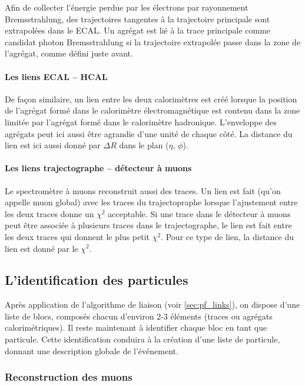 Afin de collecter l'énergie perdue par les électrons par rayonnement Bremsstrahlung, des trajectoires tangentes à la trajectoire principale sont extrapolées dans le ECAL. Un agrégat est lié à la trace principale comme candidat photon Bremsstrahlung si la trajectoire extrapolée passe dans la zone de l'agrégat, comme défini juste avant.

\paragraph{Les liens ECAL – HCAL}

De façon similaire, un lien entre les deux calorimètres est créé lorsque la position de l'agrégat formé dans le calorimètre électromagnétique est contenu dans la zone limitée par l'agrégat formé dans le calorimètre hadronique. L'enveloppe des agrégats peut ici aussi être agrandie d'une unité de chaque côté. La distance du lien est ici aussi donné par $\Delta R$ dans le plan ($\eta$, $\phi$).

\paragraph{Les liens trajectographe – détecteur à muons} \label{sec:pf_link_mu}

Le spectromètre à muons reconstruit aussi des traces. Un lien est fait (qu'on appelle muon global) avec les traces du trajectopraphe lorsque l'ajustement entre les deux traces donne un $\chi^2$ acceptable. Si une trace dans le détecteur à muons peut être associée à plusieurs traces dans le trajectographe, le lien est fait entre les deux traces qui donnent le plus petit $\chi^2$. Pour ce type de lien, la distance du lien est donné par le $\chi^2$.

\subsection{L'identification des particules}

Après application de l'algorithme de liaison (voir \cref{sec:pf_links}), on dispose d'une liste de blocs, composés chacun d'environ 2-3 éléments (traces ou agrégats calorimétriques). Il reste maintenant à identifier chaque bloc en tant que particule. Cette identification conduira à la création d'une liste de particule, donnant une description globale de l'événement.

\subsubsection{Reconstruction des muons}

